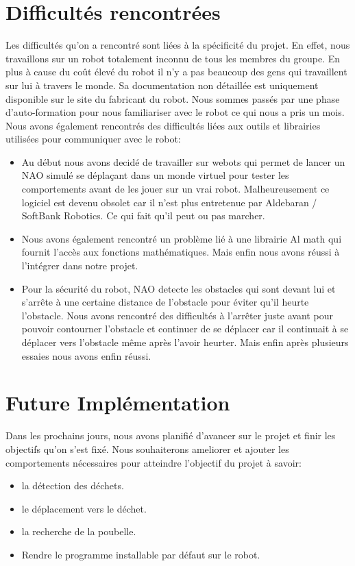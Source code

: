 \documentclass{article}
\begin{document}
   \section{Difficultés rencontrées}
   Les difficultés qu'on a rencontré sont liées à la spécificité du projet. En effet, nous travaillons sur un robot totalement inconnu de tous les membres du groupe. En plus à cause du coût élevé du robot il n'y a pas beaucoup des gens qui travaillent sur lui à travers le monde. Sa documentation non détaillée est uniquement disponible sur le site du fabricant du robot. Nous sommes passés par une phase d'auto-formation pour nous familiariser avec le robot ce qui nous a pris un mois.
   Nous avons également rencontrés des difficultés liées aux outils et librairies utilisées pour communiquer avec le robot:
    \begin{itemize}
       \item    Au début nous avons decidé de travailler sur webots qui permet de lancer un NAO simulé se déplaçant dans un monde virtuel pour tester les comportements avant de les jouer sur un vrai robot.
   Malheureusement ce logiciel est devenu obsolet car il n’est plus
   entretenue par Aldebaran / SoftBank Robotics. Ce qui fait qu’il peut ou pas marcher.
       \item Nous avons également rencontré un problème lié à une librairie Al math qui fournit  l'accès aux fonctions mathématiques. Mais enfin nous avons réussi à l'intégrer dans notre projet.
       \item Pour la sécurité du robot, NAO detecte les obstacles qui sont devant lui et s'arrête à une certaine distance de l'obstacle pour éviter qu'il heurte l'obstacle. Nous avons rencontré des difficultés à l'arrêter juste avant pour pouvoir contourner l'obstacle et continuer de se déplacer car il continuait à se déplacer vers l'obstacle même après l'avoir heurter. Mais enfin après plusieurs essaies nous avons enfin réussi.
   \end{itemize}
   
   \section{Future Implémentation }
   Dans les prochains jours, nous avons planifié d'avancer sur le projet et finir les objectifs qu'on s'est fixé. Nous souhaiterons ameliorer et ajouter les comportements nécessaires pour atteindre l'objectif du projet à savoir:
    \begin{itemize}
       \item la détection des déchets.
       \item le déplacement vers le déchet.
       \item la recherche de la poubelle.
       \item Rendre le programme installable par défaut sur le robot.
   \end{itemize}
\end{document}

